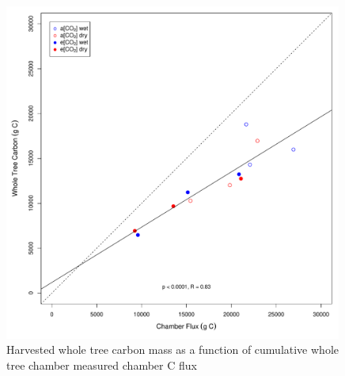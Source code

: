 \documentclass[a4paper]{article}
\begin{document}
\begin{figure}[h!]
    \centering
    \includegraphics[width=0.99\textwidth]{WTCI_fluxmass.pdf}
    \caption{Harvested whole tree carbon mass as a function of cumulative whole tree chamber measured chamber C flux}
    \label{fig:figure2}
\end{figure}
\end{document}
